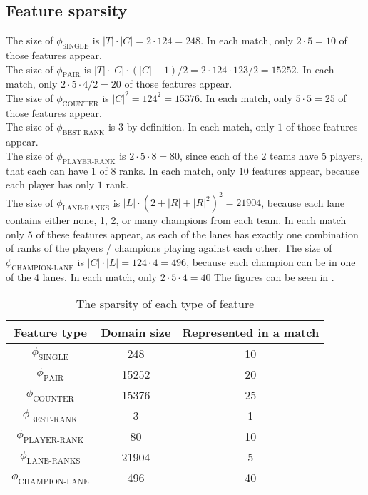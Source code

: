 \subsection{Feature sparsity}\label{sec:featuresparsity}
The size of $\phi_{\text{SINGLE}}$ is $|T| \cdot |C| = 2 \cdot 124 = 248$. In each match, only $2 \cdot 5 = 10$ of those features appear.\\
The size of $\phi_{\text{PAIR}}$ is $|T| \cdot |C| \cdot (|C|-1) / 2 = 2 \cdot 124 \cdot 123 / 2 = 15252$. In each match, only $2 \cdot 5 \cdot 4 / 2 = 20$ of those features appear.\\
The size of $\phi_{\text{COUNTER}}$ is $|C|^2 = 124^2 = 15376$. In each match, only $5 \cdot 5 = 25$ of those features appear.\\
The size of $\phi_{\text{BEST-RANK}}$ is 3 by definition. In each match, only $1$ of those features appear.\\
The size of $\phi_{\text{PLAYER-RANK}}$ is $2 \cdot 5 \cdot 8 = 80$, since each of the $2$ teams have $5$ players, that each can have $1$ of $8$ ranks. In each match, only $10$ features appear, because each player has only $1$ rank.\\
The size of $\phi_{\text{LANE-RANKS}}$ is $|L| \cdot (2 + |R| + |R|^2)^2 = 21904$, because each lane contains either none, 1, 2, or many champions from each team.
In each match only $5$ of these features appear, as each of the lanes has exactly one combination of ranks of the players / champions playing against each other.
The size of $\phi_{\text{CHAMPION-LANE}}$ is $|C| \cdot |L| = 124 \cdot 4 = 496$, because each champion can be in one of the 4 lanes. In each match, only $2 \cdot 5 \cdot 4 = 40$ 
The figures can be seen in .

\begin{center}
\begin{table}[h]
\begin{tabular}{|c|c|c|}
\hline
Feature type                & Domain size & Represented in a match \\ \hline
$\phi_{\text{SINGLE}}$      & 248         & 10                     \\ \hline
$\phi_{\text{PAIR}}$        & 15252       & 20                     \\ \hline
$\phi_{\text{COUNTER}}$     & 15376       & 25                     \\ \hline
$\phi_{\text{BEST-RANK}}$   & 3           & 1                      \\ \hline
$\phi_{\text{PLAYER-RANK}}$ & 80          & 10                     \\ \hline
$\phi_{\text{LANE-RANKS}}$  & 21904       & 5                      \\ \hline
$\phi_{\text{CHAMPION-LANE}}$ & 496       & 40                     \\ \hline
\end{tabular}
\caption{The sparsity of each type of feature}\label{tab:featuresparsity}
\end{table}
\end{center}

